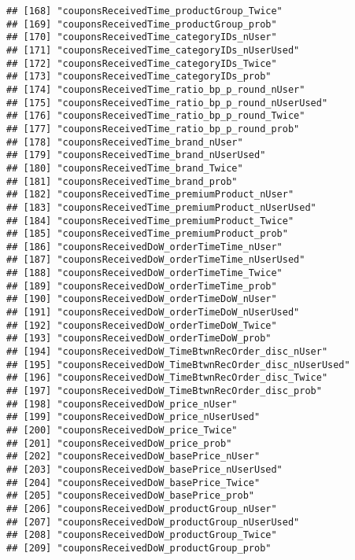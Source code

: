 \documentclass[10pt]{report}
\begin{document}
\begin{verbatim}
## [168] "couponsReceivedTime_productGroup_Twice"             
## [169] "couponsReceivedTime_productGroup_prob"              
## [170] "couponsReceivedTime_categoryIDs_nUser"              
## [171] "couponsReceivedTime_categoryIDs_nUserUsed"          
## [172] "couponsReceivedTime_categoryIDs_Twice"              
## [173] "couponsReceivedTime_categoryIDs_prob"               
## [174] "couponsReceivedTime_ratio_bp_p_round_nUser"         
## [175] "couponsReceivedTime_ratio_bp_p_round_nUserUsed"     
## [176] "couponsReceivedTime_ratio_bp_p_round_Twice"         
## [177] "couponsReceivedTime_ratio_bp_p_round_prob"          
## [178] "couponsReceivedTime_brand_nUser"                    
## [179] "couponsReceivedTime_brand_nUserUsed"                
## [180] "couponsReceivedTime_brand_Twice"                    
## [181] "couponsReceivedTime_brand_prob"                     
## [182] "couponsReceivedTime_premiumProduct_nUser"           
## [183] "couponsReceivedTime_premiumProduct_nUserUsed"       
## [184] "couponsReceivedTime_premiumProduct_Twice"           
## [185] "couponsReceivedTime_premiumProduct_prob"            
## [186] "couponsReceivedDoW_orderTimeTime_nUser"             
## [187] "couponsReceivedDoW_orderTimeTime_nUserUsed"         
## [188] "couponsReceivedDoW_orderTimeTime_Twice"             
## [189] "couponsReceivedDoW_orderTimeTime_prob"              
## [190] "couponsReceivedDoW_orderTimeDoW_nUser"              
## [191] "couponsReceivedDoW_orderTimeDoW_nUserUsed"          
## [192] "couponsReceivedDoW_orderTimeDoW_Twice"              
## [193] "couponsReceivedDoW_orderTimeDoW_prob"               
## [194] "couponsReceivedDoW_TimeBtwnRecOrder_disc_nUser"     
## [195] "couponsReceivedDoW_TimeBtwnRecOrder_disc_nUserUsed" 
## [196] "couponsReceivedDoW_TimeBtwnRecOrder_disc_Twice"     
## [197] "couponsReceivedDoW_TimeBtwnRecOrder_disc_prob"      
## [198] "couponsReceivedDoW_price_nUser"                     
## [199] "couponsReceivedDoW_price_nUserUsed"                 
## [200] "couponsReceivedDoW_price_Twice"                     
## [201] "couponsReceivedDoW_price_prob"                      
## [202] "couponsReceivedDoW_basePrice_nUser"                 
## [203] "couponsReceivedDoW_basePrice_nUserUsed"             
## [204] "couponsReceivedDoW_basePrice_Twice"                 
## [205] "couponsReceivedDoW_basePrice_prob"                  
## [206] "couponsReceivedDoW_productGroup_nUser"              
## [207] "couponsReceivedDoW_productGroup_nUserUsed"          
## [208] "couponsReceivedDoW_productGroup_Twice"              
## [209] "couponsReceivedDoW_productGroup_prob"               

\end{verbatim}
\end{document}
